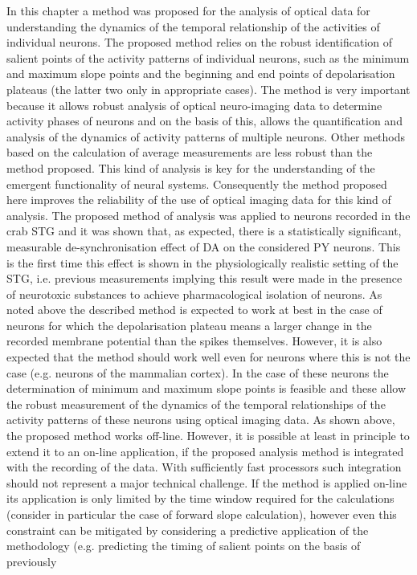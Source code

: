 In this chapter a method was proposed for the analysis of optical data for understanding the dynamics of the temporal relationship of the activities of individual neurons. The proposed method relies on the robust identification of salient points of the activity patterns of individual neurons, such as the minimum and maximum slope points and the beginning and end points of depolarisation plateaus (the latter two only in appropriate cases). The method is very important because it allows robust analysis of optical neuro-imaging data to determine activity phases of neurons and on the basis of this, allows the quantification and analysis of the dynamics of activity patterns of multiple neurons. Other methods based on the calculation of average measurements are less robust than the method proposed. This kind of analysis is key for the understanding of the emergent functionality of neural systems. Consequently the method proposed here improves the reliability of the use of optical imaging data for this kind of analysis. The proposed method of analysis was applied to neurons recorded in the crab \ac{STG} and it was shown that, as expected, there is a statistically significant, measurable de-synchronisation effect of \ac{DA} on the considered \ac{PY} neurons. This is the first time this effect is shown in the physiologically realistic setting of the \ac{STG}, i.e. previous measurements implying this result were made in the presence of neurotoxic substances to achieve pharmacological isolation of neurons. As noted above the described method is expected to work at best in the case of neurons for which the depolarisation plateau means a larger change in the recorded membrane potential than the spikes themselves. However, it is also expected that the method should work well even for neurons where this is not the case (e.g. neurons of the mammalian cortex). In the case of these neurons the determination of minimum and maximum slope points is feasible and these allow the robust measurement of the dynamics of the temporal relationships of the activity patterns of these neurons using optical imaging data. As shown above, the proposed method works off-line. However, it is possible at least in principle to extend it to an on-line application, if the proposed analysis method is integrated with the recording of the data. With sufficiently fast processors such integration should not represent a major technical challenge. If the method is applied on-line its application is only limited by the time window required for the calculations (consider in particular the case of forward slope calculation), however even this constraint can be mitigated by considering a predictive application of the methodology (e.g. predicting the timing of salient points on the basis of previously
